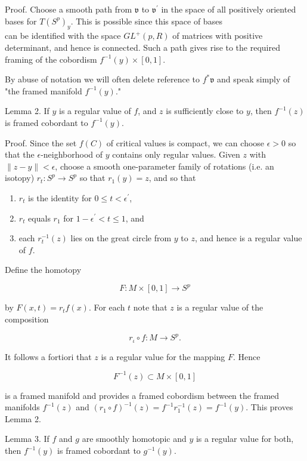 \documentclass[10pt, letterpaper]{article}
\begin{document}
Proof. Choose a smooth path from $\mathfrak{v}$ to $\mathfrak{v}^{\prime}$ in the space of all positively oriented bases for $T\left(S^{p}\right)_{y}$. This is possible since this space of bases\\
can be identified with the space $G L^{+}(p, R)$ of matrices with positive determinant, and hence is connected. Such a path gives rise to the required framing of the cobordism $f^{-1}(y) \times[0,1]$.

By abuse of notation we will often delete reference to $f^{*} \mathfrak{v}$ and speak simply of "the framed manifold $f^{-1}(y)$."

Lemma 2. If $y$ is a regular value of $f$, and $z$ is sufficiently close to $y$, then $f^{-1}(z)$ is framed cobordant to $f^{-1}(y)$.

Proof. Since the set $f(C)$ of critical values is compact, we can choose $\epsilon>0$ so that the $\epsilon$-neighborhood of $y$ contains only regular values. Given $z$ with $\|z-y\|<\epsilon$, choose a smooth one-parameter family of rotations (i.e. an isotopy) $r_{t}: S^{p} \rightarrow S^{p}$ so that $r_{1}(y)=z$, and so that

\begin{enumerate}
  \item $r_{t}$ is the identity for $0 \leq t<\epsilon^{\prime}$,
  \item $r_{t}$ equals $r_{1}$ for $1-\epsilon^{\prime}<t \leq 1$, and
  \item each $r_{t}^{-1}(z)$ lies on the great circle from $y$ to $z$, and hence is a regular value of $f$.
\end{enumerate}

Define the homotopy

$$
F: M \times[0,1] \rightarrow S^{p}
$$

by $F(x, t)=r_{t} f(x)$. For each $t$ note that $z$ is a regular value of the composition

$$
r_{\iota} \circ f: M \rightarrow S^{p} .
$$

It follows a fortiori that $z$ is a regular value for the mapping $F$. Hence

$$
F^{-1}(z) \subset M \times[0,1]
$$

is a framed manifold and provides a framed cobordism between the framed manifolds $f^{-1}(z)$ and $\left(r_{1} \circ f\right)^{-1}(z)=f^{-1} r_{1}^{-1}(z)=f^{-1}(y)$. This proves Lemma 2.

Lemma 3. If $f$ and $g$ are smoothly homotopic and $y$ is a regular value for both, then $f^{-1}(y)$ is framed cobordant to $g^{-1}(y)$.
\end{document}
